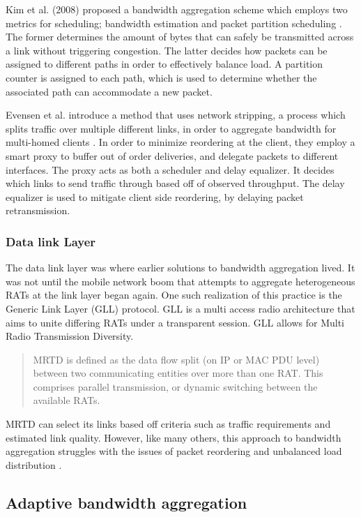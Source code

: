 \documentclass[12pt]{article}
\begin{document}
		Kim et al. (2008) proposed a bandwidth aggregation scheme which employs two metrics for scheduling; bandwidth estimation and packet partition scheduling \cite{kim2008packet}. The former determines the amount of bytes that can safely be transmitted across a link without triggering congestion. The latter decides how packets can be assigned to different paths in order to effectively balance load. A partition counter is assigned to each path, which is used to determine whether the associated path can accommodate a new packet.

		Evensen et al. introduce a method that uses network stripping, a process which splits traffic over multiple different links, in order to aggregate bandwidth for multi-homed clients \cite{5355198}. In order to minimize reordering at the client, they employ a smart proxy to buffer out of order deliveries, and delegate packets to different interfaces. The proxy acts as both a scheduler and delay equalizer. It decides which links to send traffic through based off of observed throughput. The delay equalizer is used to mitigate client side reordering, by delaying packet retransmission.

	\subsubsection{Data link Layer}
		The data link layer was where earlier solutions to bandwidth aggregation lived. It was not until the mobile network boom that attempts to aggregate heterogeneous RATs at the link layer began again. One such realization of this practice is the Generic Link Layer (GLL) protocol. GLL is a multi access radio architecture that aims to unite differing RATs under a transparent session. GLL allows for Multi Radio Transmission Diversity.
		\begin{quote}
			MRTD is defined as the data flow split (on IP or MAC PDU level) between two communicating entities over more than one RAT. This comprises parallel transmission, or dynamic switching between the available RATs.\cite{GLL:2005}
		\end{quote}
		MRTD can select its links based off criteria such as traffic requirements and estimated link quality. However, like many others, this approach to bandwidth aggregation struggles with the issues of packet reordering and unbalanced load distribution \cite{Ramaboli20121674}.

\subsection{Adaptive bandwidth aggregation}
\end{document}
